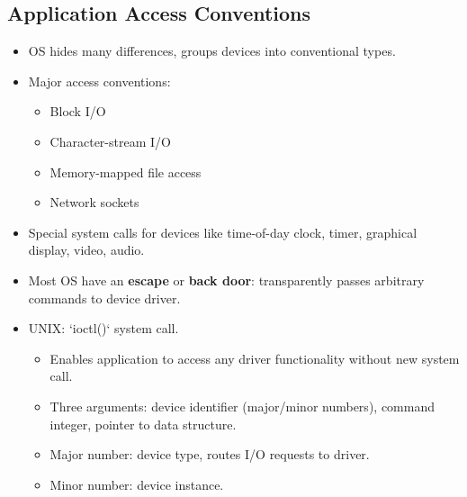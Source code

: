 \subsection{Application Access Conventions}
\begin{itemize}
    \item OS hides many differences, groups devices into conventional types.
    \item Major access conventions:
    \begin{itemize}
        \item Block I/O
        \item Character-stream I/O
        \item Memory-mapped file access
        \item Network sockets
    \end{itemize}
    \item Special system calls for devices like time-of-day clock, timer, graphical display, video, audio.
    \item Most OS have an \textbf{escape} or \textbf{back door}: transparently passes arbitrary commands to device driver.
    \item UNIX: `ioctl()` system call.
    \begin{itemize}
        \item Enables application to access any driver functionality without new system call.
        \item Three arguments: device identifier (major/minor numbers), command integer, pointer to data structure.
        \item Major number: device type, routes I/O requests to driver.
        \item Minor number: device instance.
    \end{itemize}
\end{itemize}

